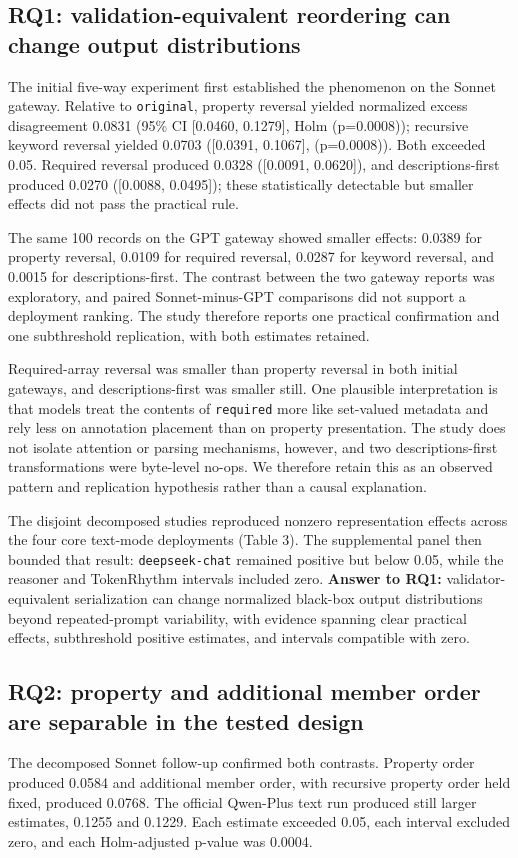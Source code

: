 \documentclass[11pt,a4paper]{article}
\begin{document}
\subsection{RQ1: validation-equivalent reordering can change output distributions}
The initial five-way experiment first established the phenomenon on the Sonnet gateway. Relative to \texttt{original}, property reversal yielded normalized excess disagreement 0.0831 (95\% CI [0.0460, 0.1279], Holm (p=0.0008)); recursive keyword reversal yielded 0.0703 ([0.0391, 0.1067], (p=0.0008)). Both exceeded 0.05. Required reversal produced 0.0328 ([0.0091, 0.0620]), and descriptions-first produced 0.0270 ([0.0088, 0.0495]); these statistically detectable but smaller effects did not pass the practical rule.

The same 100 records on the GPT gateway showed smaller effects: 0.0389 for property reversal, 0.0109 for required reversal, 0.0287 for keyword reversal, and 0.0015 for descriptions-first. The contrast between the two gateway reports was exploratory, and paired Sonnet-minus-GPT comparisons did not support a deployment ranking. The study therefore reports one practical confirmation and one subthreshold replication, with both estimates retained.

Required-array reversal was smaller than property reversal in both initial gateways, and descriptions-first was smaller still. One plausible interpretation is that models treat the contents of \texttt{required} more like set-valued metadata and rely less on annotation placement than on property presentation. The study does not isolate attention or parsing mechanisms, however, and two descriptions-first transformations were byte-level no-ops. We therefore retain this as an observed pattern and replication hypothesis rather than a causal explanation.

The disjoint decomposed studies reproduced nonzero representation effects across the four core text-mode deployments (Table 3). The supplemental panel then bounded that result: \texttt{deepseek-chat} remained positive but below 0.05, while the reasoner and TokenRhythm intervals included zero. \textbf{Answer to RQ1:} validator-equivalent serialization can change normalized black-box output distributions beyond repeated-prompt variability, with evidence spanning clear practical effects, subthreshold positive estimates, and intervals compatible with zero.

\subsection{RQ2: property and additional member order are separable in the tested design}
The decomposed Sonnet follow-up confirmed both contrasts. Property order produced 0.0584 and additional member order, with recursive property order held fixed, produced 0.0768. The official Qwen-Plus text run produced still larger estimates, 0.1255 and 0.1229. Each estimate exceeded 0.05, each interval excluded zero, and each Holm-adjusted p-value was 0.0004.
\end{document}
